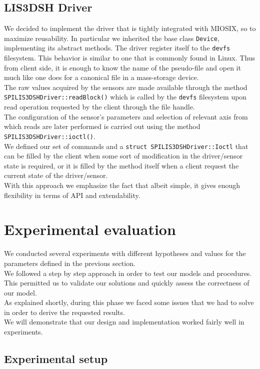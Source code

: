 \subsection{LIS3DSH Driver}
We decided to implement the driver that is tightly integrated with MIOSIX, so to maximize reusability. In particular we inherited the base class \texttt{Device}, implementing its abstract methods. The driver register itself to the \texttt{devfs} filesystem. This behavior is similar to one that is commonly found in Linux. Thus from client side, it is enough to know the name of the pseudo-file and open it much like one does for a canonical file in a mass-storage device.  \\ The raw values acquired by the sensors are made available through the method \\ \texttt{SPILIS3DSHDriver::readBlock()} which is called by the \texttt{devfs} filesystem upon read operation requested by the client through the file handle. \\
The configuration of the sensor's parameters and selection of relevant axis from which reads are later performed is carried out using the method \texttt{SPILIS3DSHDriver::ioctl()}. \\ We defined our set of commands and a \texttt{struct SPILIS3DSHDriver::Ioctl} that can be filled by the client when some sort of modification in the driver/sensor state is required, or it is filled by the method itself when a client request the current state of the driver/sensor. \\ With this approach we emphasize the fact that albeit simple, it gives enough flexibility in terms of API and extendability.

\section{Experimental evaluation}
We conducted several experiments with different hypotheses and values for the parameters defined in the previous section. \\
We followed a step by step approach in order to test our models and procedures. This permitted us to validate our solutions and quickly assess the correctness of our model. \\
As explained shortly, during this phase we faced some issues that we had to solve in order to derive the requested results. \\
We will demonstrate that our design and implementation worked fairly well in experiments.
\subsection{Experimental setup}
